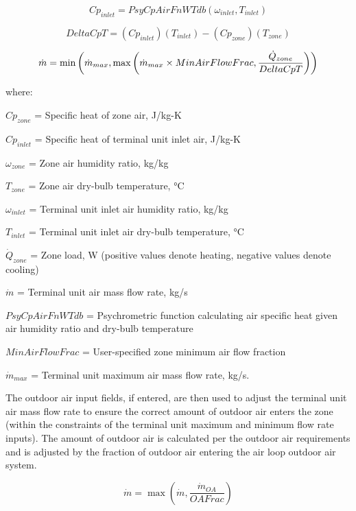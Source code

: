 \begin{equation}
C{p_{inlet}} = PsyCpAirFnWTdb\left( {{\omega_{inlet}},{T_{inlet}}} \right)
\end{equation}

\begin{equation}
DeltaCpT = \left( {C{p_{inlet}}} \right)\left( {{T_{inlet}}} \right) - \left( {C{p_{zone}}} \right)\left( {{T_{zone}}} \right)
\end{equation}

\begin{equation}
  \dot{m} = \min \left( \dot{m}_{max}, \max \left( \dot{m}_{max}\times MinAirFlowFrac,\frac{\dot{Q}_{zone}}{DeltaCpT} \right) \right)
\end{equation}

where:

\(C{p_{zone}}\) = Specific heat of zone air, J/kg-K

\(C{p_{inlet}}\) = Specific heat of terminal unit inlet air, J/kg-K

\({\omega_{zone}}\) = Zone air humidity ratio, kg/kg

\({T_{zone}}\) = Zone air dry-bulb temperature, °C

\({\omega_{inlet}}\) = Terminal unit inlet air humidity ratio, kg/kg

\({T_{inlet}}\) = Terminal unit inlet air dry-bulb temperature, °C

\({\dot Q_{zone}}\) = Zone load, W (positive values denote heating, negative values denote cooling)

\(\dot m\) = Terminal unit air mass flow rate, kg/s

\(PsyCpAirFnWTdb\) = Psychrometric function calculating air specific heat given air humidity ratio and dry-bulb temperature

\(MinAirFlowFrac\) = User-specified zone minimum air flow fraction

\({\dot m_{max}}\) = Terminal unit maximum air mass flow rate, kg/s.

The outdoor air input fields, if entered, are then used to adjust the terminal unit air mass flow rate to ensure the correct amount of outdoor air enters the zone (within the constraints of the terminal unit maximum and minimum flow rate inputs). The amount of outdoor air is calculated per the outdoor air requirements and is adjusted by the fraction of outdoor air entering the air loop outdoor air system.

\begin{equation}
\dot m = \max \left( \dot m, \frac{\dot m_{OA}}{OAFrac} \right)
\end{equation}

